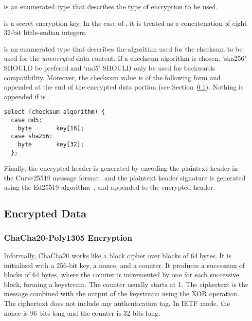  is an enumerated type that describes the type of encryption to be used.

 is a secret encryption key.
%
In the case of , it is treated as a
concatenation of eight 32-bit little-endian integers.

 is an enumerated type that describes the algorithm
used for the checksum to be used for the \emph{unencryted} data content.
%
If a checksum algorithm is chosen, `sha256' SHOULD be prefered and
`md5' SHOULD only be used for backwards compatibility.
%
Moreover, the checksum value is of the following form and appended at
the end of the encrypted data portion (see
Section~\ref{encrypted:data}). Nothing is appended if
 is .
%
\begin{verbatim}
select (checksum_algorithm) {
  case md5:
    byte       key[16];
  case sha256:
    byte       key[32];
  };
\end{verbatim}


Finally, the encrypted header is generated by encoding the plaintext
header in the Curve25519 message format~\cite{RFC7748} and
%
the plaintext header signature is generated using the Ed25519
algorithm~\cite{RFC8032}, and appended to the encrypted header.

\subsection{Encrypted Data}\label{encrypted:data}
\subsubsection{ChaCha20-Poly1305 Encryption}

Informally, ChaCha20 works like a block cipher over blocks of 64 bytes.
%
It is initialized with a 256-bit key, a nonce, and a counter.
%
It produces a succession of blocks of 64 bytes, where the counter is
incremented by one for each successive block, forming a keystream.
%
The counter usually starts at 1.
%
The ciphertext is the message combined with the output of the
keystream using the XOR operation.
%
The ciphertext does not include any authentication tag.
%
In IETF mode, the nonce is 96 bits long and the counter is 32 bits
long.

